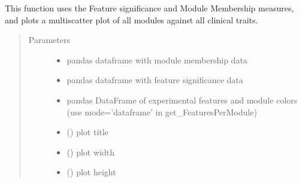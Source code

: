 \documentclass[letterpaper,10pt,english]{sphinxmanual}
\begin{document}

\begin{fulllineitems}
\label{\detokenize{_autosummary/analytics_core.viz:analytics_core.viz.wgcnaFigures.plot_intramodular_correlation}}
This function uses the Feature significance and Module Membership measures, and plots a multi\sphinxhyphen{}scatter plot of all modules against all clinical traits.
\begin{quote}\begin{description}
\item[{Parameters}] \leavevmode\begin{itemize}
\item {} 
 \textendash{} pandas dataframe with module membership data

\item {} 
 \textendash{} pandas dataframe with feature significance data

\item {} 
 \textendash{} pandas DataFrame of experimental features and module colors (use mode=’dataframe’ in get\_FeaturesPerModule)

\item {} 
 () \textendash{} plot title

\item {} 
 () \textendash{} plot width

\item {} 
 () \textendash{} plot height


\end{itemize}
\end{description}
\end{quote}
\end{fulllineitems}
\end{document}
